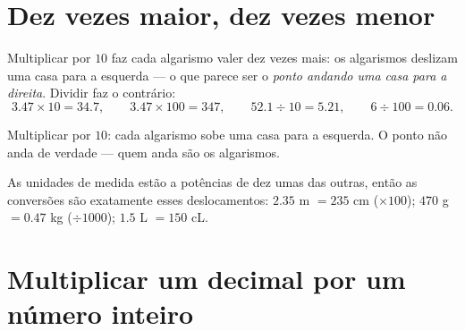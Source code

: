 \section{Dez vezes maior, dez vezes menor}

\begin{proposition}\label{prop:g5:decimalops:shift}
Multiplicar por $10$ faz cada algarismo valer dez vezes mais: os
algarismos deslizam uma casa para a esquerda --- o que parece ser o
\emph{ponto andando uma casa para a direita}. Dividir faz o
contrário:
\[
3.47 \times 10 = 34.7, \qquad
3.47 \times 100 = 347, \qquad
52.1 \div 10 = 5.21, \qquad
6 \div 100 = 0.06 .
\]
\end{proposition}
\admitted

\begin{omfigure}

{\small Multiplicar por $10$: cada algarismo sobe uma casa para a
esquerda. O ponto não anda de verdade --- quem anda são os
algarismos.}
\end{omfigure}

\begin{example}\label{ex:g5:decimalops:convert}
As unidades de medida estão a potências de dez umas das outras, então
as conversões são exatamente esses deslocamentos: $2.35$ m $= 235$ cm
($\times 100$); $470$ g $= 0.47$ kg ($\div 1000$); $1.5$ L $= 150$
cL.
\end{example}

\section{Multiplicar um decimal por um número inteiro}

